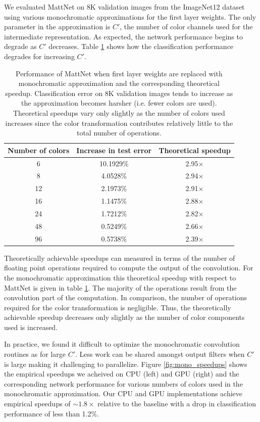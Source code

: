We evaluated MattNet on 8K validation images from the ImageNet12 dataset using various monochromatic approximations for the first layer weights. The only parameter in the approximation is $C'$, the number of color channels used for the intermediate representation. As expected, the network performance begins to degrade as $C'$ decreases. Table \ref{table:mono_perf} shows how the classification performance degrades for increasing $C'$. 

\begin{table}[t]
\tiny
\centering
\begin{tabular}{ccc}
\hline
Number of colors \hspace{2mm} & Increase in test error & \hspace{2mm}Theoretical speedup\\
\hline
6 & 10.1929\% & 2.95$\times$ \\
8 & 4.0528\% & 2.94$\times$\\
12 & 2.1973\% & 2.91$\times$\\
16 & 1.1475\% & 2.88$\times$\\
24 & 1.7212\% & 2.82$\times$\\
48 & 0.5249\% & 2.66$\times$\\
96 & 0.5738\% & 2.39$\times$ \\
\hline 
\end{tabular}
\caption{Performance of MattNet when first layer weights are replaced with monochromatic approximation and the corresponding theoretical speedup. Classification error on 8K validation images tends to increase as the approximation becomes harsher (i.e. fewer colors are used). Theoretical speedups vary only slightly as the number of colors used increases since the color transformation contributes relatively little to the total number of operations.} 
\label{table:mono_perf}
\end{table}


Theoretically achievable speedups can measured in terms of the number of floating point operations required to compute the output of the convolution. 
For the monochromatic approximation this theoretical speedup with respect to MattNet is given in table \ref{table:mono_perf}. 
The majority of the operations result from the convolution part of the computation. In comparison, the number of operations required for the color transformation is negligible. Thus, the theoretically achievable speedup decreases only slightly as the number of color components used is increased. 

In practice, we found it difficult to optimize the monochromatic convolution routines as for large $C'$. Less work can be shared amongst output filters when $C'$ is large making it challenging to parallelize.
Figure \ref{fig:mono_speedups} shows the empirical speedups we acheived on CPU (left) and GPU (right) and the corresponding network performance for various numbers of colors used in the monochromatic approximation.   
Our CPU and GPU implementations achieve empirical speedups of $\sim1.8\times$ relative to the baseline with a drop in classification performance of less than 1.2\%. 

